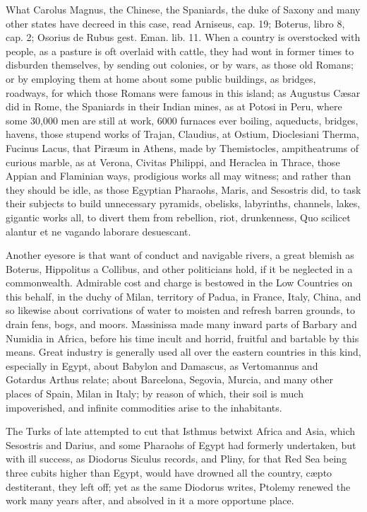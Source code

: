 {What Carolus Magnus, the Chinese, the Spaniards, the duke of Saxony and
many other states have decreed in this case, read Arniseus, cap. 19;
Boterus, libro 8, cap. 2; Osorius de Rubus gest. Eman. lib. 11. When a
country is overstocked with people, as a pasture is oft overlaid with
cattle, they had wont in former times to disburden themselves, by
sending out colonies, or by wars, as those old Romans; or by employing
them at home about some public buildings, as bridges, roadways, for
which those Romans were famous in this island; as Augustus C\ae{}sar did
in Rome, the Spaniards in their Indian mines, as at Potosi in Peru,
where some 30,000 men are still at work, 6000 furnaces ever boiling,
\etc{} aqueducts, bridges, havens, those stupend works of Trajan,
Claudius, at Ostium, Dioclesiani Therma, Fucinus Lacus, that
Pir\ae{}um in Athens, made by Themistocles, ampitheatrums of curious
marble, as at Verona, Civitas Philippi, and Heraclea in Thrace, those
Appian and Flaminian ways, prodigious works all may witness; and rather
than they should be idle, as those  Egyptian Pharaohs, Maris,
and Sesostris did, to task their subjects to build unnecessary
pyramids, obelisks, labyrinths, channels, lakes, gigantic works all, to
divert them from rebellion, riot, drunkenness, Quo scilicet
alantur et ne vagando laborare desuescant.

Another eyesore is that want of conduct and navigable rivers, a great
blemish as Boterus, Hippolitus a Collibus, and other
politicians hold, if it be neglected in a commonwealth. Admirable cost
and charge is bestowed in the Low Countries on this behalf, in the
duchy of Milan, territory of Padua, in France, Italy, China, and
so likewise about corrivations of water to moisten and refresh barren
grounds, to drain fens, bogs, and moors. Massinissa made many inward
parts of Barbary and Numidia in Africa, before his time incult and
horrid, fruitful and bartable by this means. Great industry is
generally used all over the eastern countries in this kind, especially
in Egypt, about Babylon and Damascus, as Vertomannus and Gotardus
Arthus relate; about Barcelona, Segovia, Murcia, and many other places
of Spain, Milan in Italy; by reason of which, their soil is much
impoverished, and infinite commodities arise to the inhabitants.

The Turks of late attempted to cut that Isthmus betwixt Africa and
Asia, which Sesostris and Darius, and some Pharaohs of Egypt had
formerly undertaken, but with ill success, as Diodorus Siculus
records, and Pliny, for that Red Sea being three cubits higher
than Egypt, would have drowned all the country, c\ae{}pto destiterant,
they left off; yet as the same Diodorus writes, Ptolemy renewed
the work many years after, and absolved in it a more opportune place.

}
